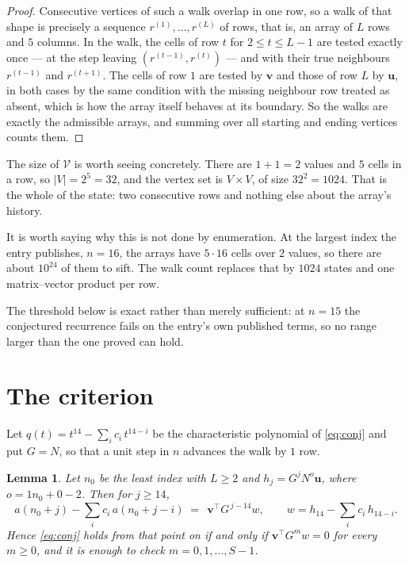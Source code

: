 \documentclass[11pt,a4paper]{article}
\theoremstyle{plain}
\newtheorem{lemma}[theorem]{Lemma}
\theoremstyle{definition}
\begin{document}
\begin{proof}
Consecutive vertices of such a walk overlap in one row, so a walk of that shape is
precisely a sequence $r^{(1)},\dots,r^{(L)}$ of rows, that is, an array of $L$ rows
and $5$ columns. In the walk, the cells of row $t$ for $2\le t\le L-1$ are tested
exactly once --- at the step leaving $(r^{(t-1)},r^{(t)})$ --- and with their true
neighbours $r^{(t-1)}$ and $r^{(t+1)}$. The cells of row $1$ are tested by
$\mathbf{v}$ and those of row $L$ by $\mathbf{u}$, in both cases by the same condition
with the missing neighbour row treated as absent, which is how the array itself behaves at
its boundary. So the walks are exactly the admissible arrays, and summing over all starting
and ending vertices counts them.
\end{proof}


The size of $\mathcal V$ is worth seeing concretely. There are $1+1=2$ values
and $5$ cells in a row, so $|V|=2^{5}=32$, and the vertex set is
$V\times V$, of size $32^2=1024$. That is the whole of the state: two consecutive
rows and nothing else about the array's history.

It is worth saying why this is not done by enumeration. At the largest index the entry
publishes, $n=16$, the arrays have $5\cdot16$ cells over
$2$ values, so there are about $10^{24}$ of them to sift. The
walk count replaces that by $1024$ states and one matrix--vector product per row.

The threshold below is exact rather than merely sufficient: at $n=15$ the conjectured
recurrence fails on the entry's own published terms, so no range larger than the one proved
can hold.
\section{The criterion}

Let $q(t)=t^{14}-\sum_i c_i\,t^{14-i}$ be the characteristic polynomial of
\eqref{eq:conj} and put $G=N$, so that a unit step in $n$ advances the walk by
$1$ row.

\begin{lemma}\label{lem:crit}
Let $n_0$ be the least index with $L\ge2$ and $h_j=G^{j}N^{o}\mathbf{u}$, where
$o=1n_0+0-2$. Then for $j\ge14$,
\[
a(n_0+j)-\sum_i c_i\,a(n_0+j-i)\;=\;\,\mathbf{v}^{\!\top}G^{\,j-14}w,
\qquad w=h_{14}-\sum_i c_i\,h_{14-i} .
\]
Hence \eqref{eq:conj} holds from that point on if and only if
$\mathbf{v}^{\!\top}G^{m}w=0$ for every $m\ge0$, and it is enough to check
$m=0,1,\dots,S-1$.
\end{lemma}
\end{document}
